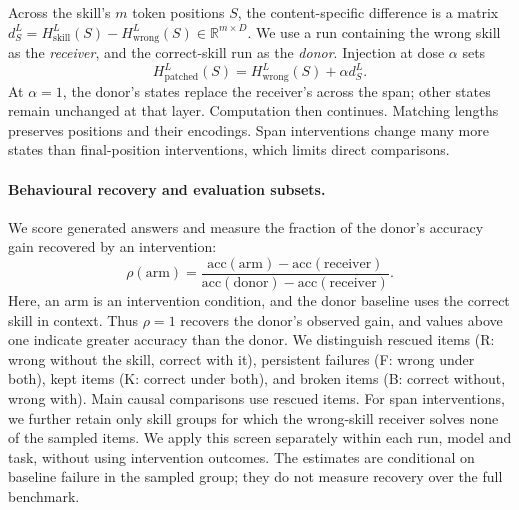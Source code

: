 \documentclass{article}
\newcommand{\dvec}{\ensuremath{d}}
\begin{document}
Across the skill's $m$ token positions $S$, the content-specific difference
is a matrix $\dvec_S^L=H^L_{\mathrm{skill}}(S)-H^L_{\mathrm{wrong}}(S)
\in\mathbb{R}^{m\times D}$. We use a run containing the wrong skill as the
\emph{receiver}, and the correct-skill run as the \emph{donor}. Injection at dose
$\alpha$ sets
\begin{equation}
H^L_{\mathrm{patched}}(S)=H^L_{\mathrm{wrong}}(S)+\alpha\dvec_S^L.
\label{eq:inject}
\end{equation}
At $\alpha=1$, the donor's states replace the receiver's across the span;
other states remain unchanged at that layer. Computation then continues.
Matching lengths preserves positions and their encodings. Span interventions
change many more states than final-position interventions, which limits direct
comparisons.

\paragraph{Behavioural recovery and evaluation subsets.}
We score generated answers and measure the fraction of the donor's accuracy
gain recovered by an intervention:
\begin{equation}
\rho(\mathrm{arm})=
\frac{\mathrm{acc}(\mathrm{arm})-\mathrm{acc}(\mathrm{receiver})}
     {\mathrm{acc}(\mathrm{donor})-\mathrm{acc}(\mathrm{receiver})}.
\label{eq:rho}
\end{equation}
Here, an arm is an intervention condition, and the donor baseline uses the
correct skill in context. Thus $\rho=1$ recovers the donor's observed gain,
and values above one indicate greater accuracy than the donor. We distinguish rescued
items (R: wrong without the skill, correct with it), persistent failures (F:
wrong under both), kept items (K: correct under both), and broken items (B:
correct without, wrong with). Main causal comparisons use rescued items. For
span interventions, we further retain only skill groups for which the
wrong-skill receiver solves none of the sampled items. We apply this screen
separately within each run, model and task, without using intervention outcomes.
The estimates are conditional on baseline failure in the sampled group;
they do not measure recovery over the full benchmark.
\end{document}
